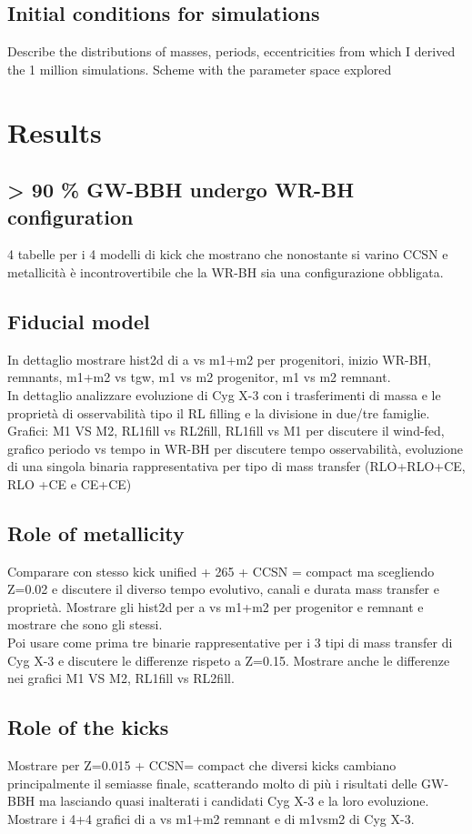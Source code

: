 \documentclass[a4paper,titlepage]{book}     	%
\begin{document}
\section{Initial conditions for simulations}
Describe the distributions of masses, periods, eccentricities from which I derived the 1 million simulations. Scheme with the parameter space explored

\chapter{Results}
\section{> 90 \% GW-BBH undergo WR-BH configuration}
4 tabelle per i 4 modelli di kick che mostrano che nonostante si varino CCSN e metallicità è incontrovertibile che la WR-BH sia una configurazione obbligata.

\section{Fiducial model}
In dettaglio mostrare hist2d di a vs m1+m2 per progenitori, inizio WR-BH, remnants, m1+m2 vs tgw, m1 vs m2 progenitor, m1 vs m2 remnant.\\
In dettaglio analizzare evoluzione di Cyg X-3 con i trasferimenti di massa e le proprietà di osservabilità tipo il RL filling e la divisione in due/tre famiglie. Grafici: M1 VS M2, RL1fill vs RL2fill, RL1fill vs M1 per discutere il wind-fed, grafico periodo vs tempo in WR-BH per discutere tempo osservabilità, evoluzione di una singola binaria rappresentativa per tipo di mass transfer (RLO+RLO+CE, RLO +CE e CE+CE)

\section{Role of metallicity}
Comparare con stesso kick unified + 265 + CCSN = compact ma scegliendo Z=0.02 e discutere il diverso tempo evolutivo, canali e durata mass transfer e proprietà.
Mostrare gli hist2d per a vs m1+m2 per progenitor e remnant e mostrare che sono gli stessi.\\
Poi usare come prima tre binarie rappresentative per i 3 tipi di mass transfer di Cyg X-3 e discutere le differenze rispeto a Z=0.15. Mostrare anche le differenze nei grafici M1 VS M2, RL1fill vs RL2fill.


\section{Role of the kicks}
Mostrare per Z=0.015 + CCSN= compact che diversi kicks cambiano principalmente il semiasse finale, scatterando molto di più i risultati delle GW-BBH ma lasciando quasi inalterati i candidati Cyg X-3 e la loro evoluzione. Mostrare i 4+4 grafici di a vs m1+m2 remnant e di m1vsm2 di Cyg X-3.
\end{document}
